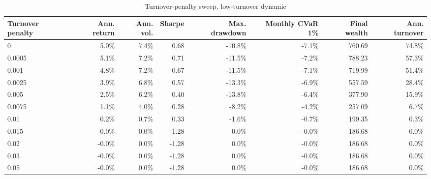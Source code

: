 \begin{table}[!htbp]
\centering
\caption{Turnover-penalty sweep, low-turnover dynamic}
\label{tab:allocation-turnover-penalty-low-turnover}
\small
\setlength{\tabcolsep}{5pt}
\renewcommand{\arraystretch}{1.12}
\begin{adjustbox}{center,max width=\linewidth}
\begin{tabular}{lrrrrrrr}
\toprule
Turnover penalty & Ann. return & Ann. vol. & Sharpe & Max. drawdown & Monthly CVaR 1\% & Final wealth & Ann. turnover \\
\midrule
0 & 5.0\% & 7.4\% & 0.68 & -10.8\% & -7.1\% & 760.69 & 74.8\% \\
0.0005 & 5.1\% & 7.2\% & 0.71 & -11.5\% & -7.2\% & 788.23 & 57.3\% \\
0.001 & 4.8\% & 7.2\% & 0.67 & -11.5\% & -7.1\% & 719.99 & 51.4\% \\
0.0025 & 3.9\% & 6.8\% & 0.57 & -13.3\% & -6.9\% & 557.59 & 28.4\% \\
0.005 & 2.5\% & 6.2\% & 0.40 & -13.8\% & -6.4\% & 377.90 & 15.9\% \\
0.0075 & 1.1\% & 4.0\% & 0.28 & -8.2\% & -4.2\% & 257.09 & 6.7\% \\
0.01 & 0.2\% & 0.7\% & 0.33 & -1.6\% & -0.7\% & 199.35 & 0.3\% \\
0.015 & -0.0\% & 0.0\% & -1.28 & 0.0\% & -0.0\% & 186.68 & 0.0\% \\
0.02 & -0.0\% & 0.0\% & -1.28 & 0.0\% & -0.0\% & 186.68 & 0.0\% \\
0.03 & -0.0\% & 0.0\% & -1.28 & 0.0\% & -0.0\% & 186.68 & 0.0\% \\
0.05 & -0.0\% & 0.0\% & -1.28 & 0.0\% & -0.0\% & 186.68 & 0.0\% \\
\bottomrule
\end{tabular}
\end{adjustbox}
\end{table}